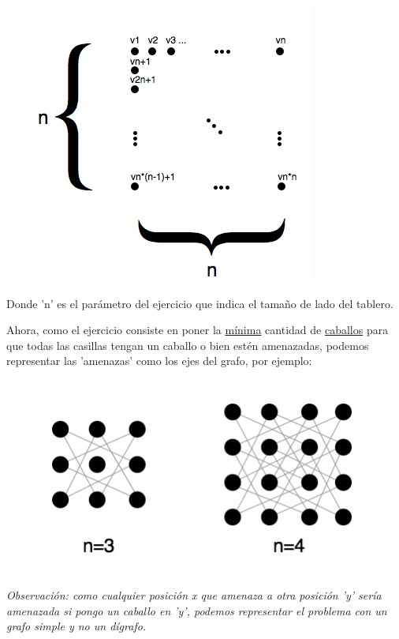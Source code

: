 \begin{figure}[h]
\begin{center}
\includegraphics[scale=0.5]{imagenes/grafos-ej1-tp3-1.jpg}
\end{center}
\end{figure}

Donde 'n' es el parámetro del ejercicio que indica el tamaño de lado del tablero.

\newpage

Ahora, como el ejercicio consiste en poner la \underline{mínima} cantidad de \underline{caballos} para que todas las casillas tengan un caballo o bien estén amenazadas, podemos representar las 'amenazas' como los ejes del grafo, por ejemplo:

\begin{figure}[h]
\begin{center}
\includegraphics[scale=0.5]{imagenes/grafos-ej1-tp3-2.jpg}
\end{center}
\end{figure}

\textit{Observación: como cualquier posición x que amenaza a otra posición 'y' sería amenazada si pongo un caballo en 'y', podemos representar el problema con un grafo simple y no un dígrafo.}

